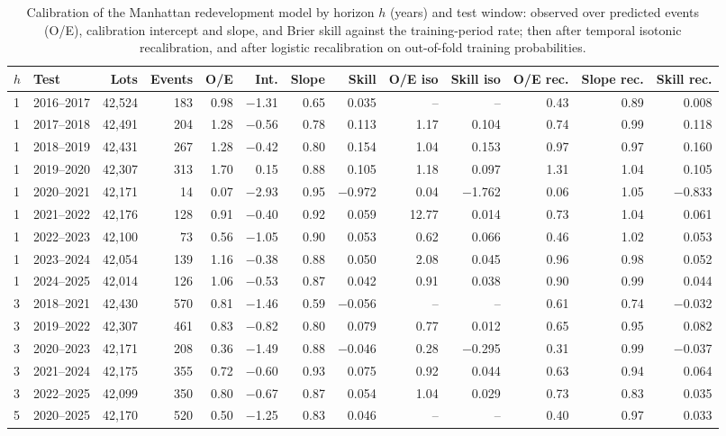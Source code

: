 \documentclass[10pt]{article}
\begin{document}
\begin{table}[t]
\centering
\scriptsize
\setlength{\tabcolsep}{2.5pt}
\caption{Calibration of the Manhattan redevelopment model by horizon $h$ (years) and test window: observed over predicted events (O/E), calibration intercept and slope, and Brier skill against the training-period rate; then after temporal isotonic recalibration, and after logistic recalibration on out-of-fold training probabilities.}
\label{tab:s-cal-mn}
\begin{tabular}{llrrrrrrrrrrr}
\toprule
$h$ & Test & Lots & Events & O/E & Int. & Slope & Skill & O/E iso & Skill iso & O/E rec. & Slope rec. & Skill rec. \\
\midrule
1 & 2016--2017 & 42{,}524 & 183 & 0.98 & $-$1.31 & 0.65 & 0.035 & -- & -- & 0.43 & 0.89 & 0.008 \\
1 & 2017--2018 & 42{,}491 & 204 & 1.28 & $-$0.56 & 0.78 & 0.113 & 1.17 & 0.104 & 0.74 & 0.99 & 0.118 \\
1 & 2018--2019 & 42{,}431 & 267 & 1.28 & $-$0.42 & 0.80 & 0.154 & 1.04 & 0.153 & 0.97 & 0.97 & 0.160 \\
1 & 2019--2020 & 42{,}307 & 313 & 1.70 & 0.15 & 0.88 & 0.105 & 1.18 & 0.097 & 1.31 & 1.04 & 0.105 \\
1 & 2020--2021 & 42{,}171 & 14 & 0.07 & $-$2.93 & 0.95 & $-$0.972 & 0.04 & $-$1.762 & 0.06 & 1.05 & $-$0.833 \\
1 & 2021--2022 & 42{,}176 & 128 & 0.91 & $-$0.40 & 0.92 & 0.059 & 12.77 & 0.014 & 0.73 & 1.04 & 0.061 \\
1 & 2022--2023 & 42{,}100 & 73 & 0.56 & $-$1.05 & 0.90 & 0.053 & 0.62 & 0.066 & 0.46 & 1.02 & 0.053 \\
1 & 2023--2024 & 42{,}054 & 139 & 1.16 & $-$0.38 & 0.88 & 0.050 & 2.08 & 0.045 & 0.96 & 0.98 & 0.052 \\
1 & 2024--2025 & 42{,}014 & 126 & 1.06 & $-$0.53 & 0.87 & 0.042 & 0.91 & 0.038 & 0.90 & 0.99 & 0.044 \\
3 & 2018--2021 & 42{,}430 & 570 & 0.81 & $-$1.46 & 0.59 & $-$0.056 & -- & -- & 0.61 & 0.74 & $-$0.032 \\
3 & 2019--2022 & 42{,}307 & 461 & 0.83 & $-$0.82 & 0.80 & 0.079 & 0.77 & 0.012 & 0.65 & 0.95 & 0.082 \\
3 & 2020--2023 & 42{,}171 & 208 & 0.36 & $-$1.49 & 0.88 & $-$0.046 & 0.28 & $-$0.295 & 0.31 & 0.99 & $-$0.037 \\
3 & 2021--2024 & 42{,}175 & 355 & 0.72 & $-$0.60 & 0.93 & 0.075 & 0.92 & 0.044 & 0.63 & 0.94 & 0.064 \\
3 & 2022--2025 & 42{,}099 & 350 & 0.80 & $-$0.67 & 0.87 & 0.054 & 1.04 & 0.029 & 0.73 & 0.83 & 0.035 \\
5 & 2020--2025 & 42{,}170 & 520 & 0.50 & $-$1.25 & 0.83 & 0.046 & -- & -- & 0.40 & 0.97 & 0.033 \\
\bottomrule
\end{tabular}
\end{table}
\end{document}
